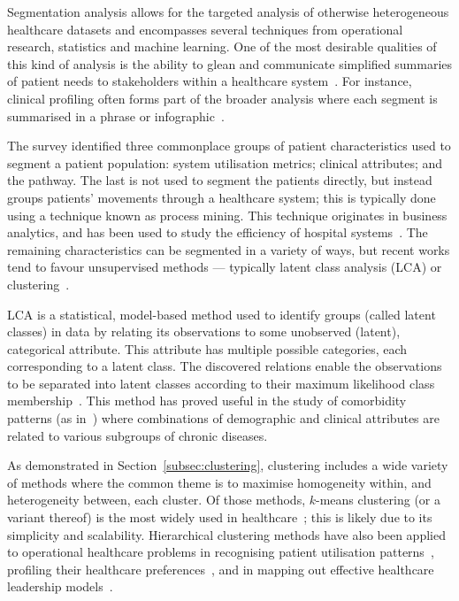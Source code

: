 Segmentation analysis allows for the targeted analysis of otherwise
heterogeneous healthcare datasets and encompasses several techniques from
operational research, statistics and machine learning. One of the most desirable
qualities of this kind of analysis is the ability to glean and communicate
simplified summaries of patient needs to stakeholders within a healthcare
system~\cite{ElDarzi2009,Tomar2013,Vuik2016b,Yoon2020}. For instance, clinical
profiling often forms part of the broader analysis where each segment is
summarised in a phrase or infographic~\cite{Vuik2016a,Yan2019}.

The survey identified three commonplace groups of patient characteristics used
to segment a patient population: system utilisation metrics; clinical
attributes; and the pathway. The last is not used to segment the patients
directly, but instead groups patients' movements through a healthcare system;
this is typically done using a technique known as process mining. This technique
originates in business analytics, and has been used to study the efficiency of
hospital systems~\cite{Arnolds2018,Delias2015}. The remaining characteristics
can be segmented in a variety of ways, but recent works tend to favour
unsupervised methods --- typically latent class analysis (LCA) or
clustering~\cite{Yan2018}.

LCA is a statistical, model-based method used to identify groups (called latent
classes) in data by relating its observations to some unobserved (latent),
categorical attribute. This attribute has multiple possible categories, each
corresponding to a latent class. The discovered relations enable the
observations to be separated into latent classes according to their maximum
likelihood class membership~\cite{Hagenaars2002,Lazarsfeld1968}. This method has
proved useful in the study of comorbidity patterns (as
in~\cite{Kuwornu2014,Larsen2017}) where combinations of demographic and clinical
attributes are related to various subgroups of chronic diseases.

As demonstrated in Section~\ref{subsec:clustering}, clustering includes a wide
variety of methods where the common theme is to maximise homogeneity within, and
heterogeneity between, each cluster. Of those methods, \(k\)-means clustering
(or a variant thereof) is the most widely used in
healthcare~\cite{%
    Elbattah2017,Haraty2015,Ogbuabor2018,Santhi2010,Silitonga2018,Vuik2016a%
}; this is likely due to its simplicity and scalability. Hierarchical clustering
methods have also been applied to operational healthcare problems in recognising
patient utilisation patterns~\cite{Zayas2016}, profiling their healthcare
preferences~\cite{Liu2009}, and in mapping out effective healthcare leadership
models~\cite{Hargett2017}.

